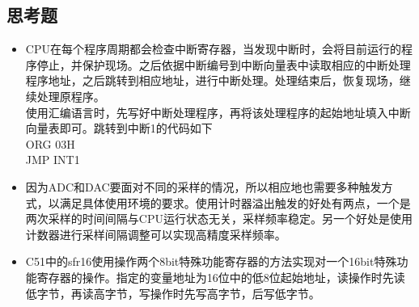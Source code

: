 \begin{CJK}
\section{思考题}
\begin{itemize}
	\item CPU在每个程序周期都会检查中断寄存器，当发现中断时，会将目前运行的程序停止，并保护现场。之后依据中断编号到中断向量表中读取相应的中断处理程序地址，之后跳转到相应地址，进行中断处理。处理结束后，恢复现场，继续处理原程序。\\
	使用汇编语言时，先写好中断处理程序，再将该处理程序的起始地址填入中断向量表即可。跳转到中断1的代码如下\\
	ORG 03H\\
	JMP INT1
	\item 因为ADC和DAC要面对不同的采样的情况，所以相应地也需要多种触发方式，以满足具体使用环境的要求。使用计时器溢出触发的好处有两点，一个是两次采样的时间间隔与CPU运行状态无关，采样频率稳定。另一个好处是使用计数器进行采样间隔调整可以实现高精度采样频率。
	\item C51中的sfr16使用操作两个8bit特殊功能寄存器的方法实现对一个16bit特殊功能寄存器的操作。指定的变量地址为16位中的低8位起始地址，读操作时先读低字节，再读高字节，写操作时先写高字节，后写低字节。
\end{itemize}

\end{CJK}

